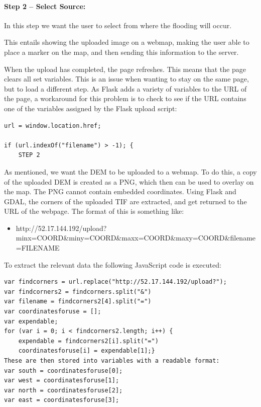 \paragraph{Step 2 – Select Source:}
In this step we want the user to select from where the flooding will occur. 

This entails showing the uploaded image on a webmap, making the user able to place a marker on the map, and then sending this information to the server.

When the upload has completed, the page refreshes. This means that the page clears all set variables. This is an issue when wanting to stay on the same page, but to load a different step. As Flask adds a variety of variables to the URL of the page, a workaround for this problem is to check to see if the URL contains  one  of the variables assigned by the Flask upload script:

\begin{lstlisting}
url = window.location.href;

if (url.indexOf("filename") > -1); {
	STEP 2

\end{lstlisting}

As mentioned, we want the DEM to be uploaded to a webmap. To do this, a copy of the uploaded DEM is created as a PNG, which then can be used to overlay on the map. The PNG cannot contain embedded coordinates. Using Flask and GDAL, the corners of the uploaded TIF are extracted, and get returned to the URL of the webpage.
The format of this is something like:

\begin{itemize}
\item http://52.17.144.192/upload?minx=COORD\&miny=COORD\&maxx=COORD\&maxy=COORD\&filename=FILENAME
\end{itemize}

To extract the relevant data the following JavaScript code is executed:

\begin{lstlisting}
var findcorners = url.replace("http://52.17.144.192/upload?");
var findcorners2 = findcorners.split("&")
var filename = findcorners2[4].split("=")
var coordinatesforuse = [];
var expendable;
for (var i = 0; i < findcorners2.length; i++) {
    expendable = findcorners2[i].split("=")
    coordinatesforuse[i] = expendable[1];}
These are then stored into variables with a readable format:
var south = coordinatesforuse[0];
var west = coordinatesforuse[1];
var north = coordinatesforuse[2];
var east = coordinatesforuse[3];

\end{lstlisting}

